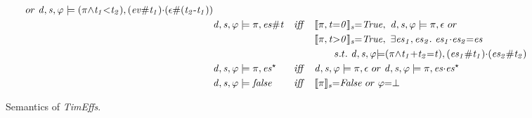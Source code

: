 \documentclass[acmsmall,10pt,review]{acmart}
\newcommand{\es}{\textcolor{black}{\ensuremath{{es}}}}
\newcommand{\timedEffects}{\emph{TimEffs}}
\newcommand\pure[1]{ \textcolor{black}{#1}}
\newcommand{\code}[1]{{\tt{\ensuremath{\m{#1}}}}}
\newcommand{\empt}{\textcolor{black}{\ensuremath{\epsilon}}}
\newcommand{\bott}{\textcolor{black}{\ensuremath{\bot}}}
\newcommand{\m}{\mathit}
\begin{document}
{\begin{figure}[]
\begin{align*}
\ or\ \code{d, s, \varphi \models \pure{(\pi{\wedge}t_1 {<}t_2)}  , (ev\#t_1){\cdot}(\epsilon \# (t_2\text{-}t_1))  } \\
&\code{d, s, \varphi \models \pure{\pi}  ,\es\# t}  &\m{iff}\quad &
 \code{\llbracket \pure{\pi}  , t {=} 0 \rrbracket_{s} {=}  
 \pure{True} }, \ \code{d, s, \varphi \models \pure{\pi}  , \empt}\ or  \\
& & &  \code{\llbracket \pure{\pi}, t {>} 0 \rrbracket_{s} {=}  
\pure{True} }, 
\  \exists \code{\es_1,\es_2}. \  \code{ es_1 {\cdot}  es_2 {=} es}\\
&&& \qquad  s.t. \ \code{d, s, \varphi {\models} \pure{(\pi {\wedge}t_1{+} t_2{=}t)}  , 
(es_1\#t_1) {\cdot} (es_2\#t_2) } \\
&\code{d, s, \varphi \models \pure{\pi}, \es^\star}  &\m{iff}\quad & 
\code{d, s, \varphi \models \pure{\pi}  , \empt}\ or \ 
\code{d, s, \varphi \models \pure{\pi}  , es {\cdot} \es^\star}\\
& \code{d, s, \varphi \models false}  &\m{iff}\quad &
 \code{\llbracket \pure{\pi}  \rrbracket_{s} {=} \pure{False} } \ or \ \code{\varphi {=} \bott}
\end{align*}
  \vspace{-2mm}
\caption{Semantics of \timedEffects .}
\label{fig:Sementic}
\vspace{-2mm}
\end{figure}




}
\end{document}
